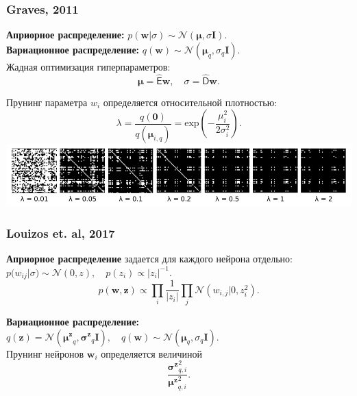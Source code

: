 \documentclass[10pt,pdf,utf8,russian,aspectratio=169]{beamer}
\begin{document}
\begin{frame}
\frametitle{ Graves, 2011}


\textbf{Априорное распределение:} $p(\mathbf{w}|\sigma) \sim \mathcal{N}(\boldsymbol{\mu}, \sigma \mathbf{I}).$\\
\textbf{Вариационное распределение:} $q (\mathbf{w}) \sim \mathcal{N}(\boldsymbol{\mu}_q, \sigma_q \mathbf{I}).$\\
Жадная оптимизация гиперпараметров:
\[
	\boldsymbol{\mu} = \hat{\mathsf{E}} \mathbf{w},
\quad
	\sigma = \hat{\mathsf{D}} \mathbf{w}.
\]

Прунинг параметра ${w}_i$ определяется относительной плотностью:
\[
	\lambda = \frac{q(\mathbf{0})}{q(\boldsymbol{\mu}_{i,q})}  = \text{exp}(-\frac{\mu_i^2}{2\sigma_i^2}).
\]
\includegraphics[width=\textwidth]{graves.png}
\end{frame}







\begin{frame}
\frametitle{ Louizos et. al, 2017}
\textbf{Априорное распределение} задается для каждого нейрона отдельно:
$p({w}_{ij}|\sigma) \sim \mathcal{N}(0, z), \quad p(z_i) \propto |z_i|^{-1}.$\\

$$p(\mathbf{w}, \mathbf{z}) \propto \prod_i \frac{1}{|z_i|} \prod_{j} \mathcal{N}(w_{i,j}|0,z_i^2).$$

\textbf{Вариационное распределение:} $q(\mathbf{z}) = \mathcal{N}(\boldsymbol{\mu^z}_q, \boldsymbol{\sigma^z}_q \mathbf{I}), \quad   q(\mathbf{w}) \sim \mathcal{N}(\boldsymbol{\mu}_q, \sigma_q \mathbf{I}).$\\


Прунинг нейронов $\mathbf{w}_i$ определяется величиной
\[
	\frac{\boldsymbol{\sigma^z}_{q,i}^2}{\boldsymbol{\mu^z}_{q,i}^2}.
\]
\end{frame}
\end{document}
